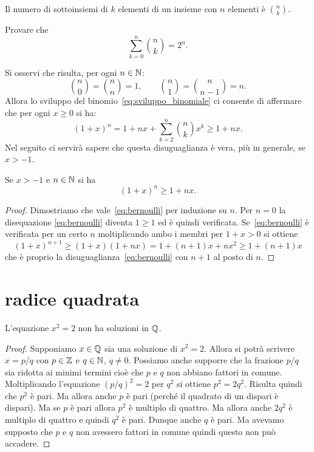 \begin{exercise}
Il numero di sottoinsiemi di $k$ elementi di un insieme con $n$ elementi
è ${n\choose k}$.
\end{exercise}

\begin{exercise}
Provare che
\[
 \sum_{k=0}^n {n \choose k} = 2^n.
\]
\end{exercise}

Si osservi che risulta, per ogni $n\in \mathbb N$:
\[
  {n\choose 0} = {n \choose n} = 1,
  \qquad
  {n \choose 1} = {n \choose n-1} = n.
\]
Allora lo sviluppo del binomio~\eqref{eq:sviluppo_binomiale}
ci consente di affermare
che per ogni $x\ge 0$ si ha:
\[
  (1+x)^n = 1 + nx + \sum_{k=2}^n {n\choose k} x^k
  \ge 1 + nx.
\]
Nel seguito ci servirà sapere che questa
disuguaglianza è vera, più in generale,
se $x > -1$.

\begin{theorem}
\label{th:disuguaglianza_bernoulli}%
\mymark{**}%
%
%
%
Se $x > -1$ e $n\in \mathbb N$ si ha
\begin{equation}
\label{eq:bernoulli}
(1+x)^n \ge 1 + nx.
\end{equation}
\end{theorem}
%
\begin{proof}
\mymark{**}
Dimostriamo che vale~\eqref{eq:bernoulli}
per induzione su $n$.
Per $n=0$ la disequazione \eqref{eq:bernoulli} diventa $1\ge 1$
ed è quindi verificata.
Se~\eqref{eq:bernoulli}
è verificata per un certo $n$
moltiplicando ambo i membri per $1+x > 0$ si ottiene
\[
(1+x)^{n+1} \ge (1+x) (1+nx) = 1 + (n+1)x + n x^2
\ge 1 + (n+1)x
\]
che è proprio la disuguaglianza~\eqref{eq:bernoulli}
con $n+1$ al posto di $n$.
\end{proof}

\section{radice quadrata}
\label{sec:radice_quadrata}

\begin{theorem}
\mymark{**}%
\label{th:pitagora}
L'equazione $x^2=2$ non ha soluzioni in $\mathbb Q$.
\end{theorem}
%
\begin{proof}
\mymark{*}%
Supponiamo $x\in \mathbb Q$ sia una soluzione di $x^2=2$.
Allora si potrà scrivere $x=p/q$ con $p\in \mathbb Z$ e $q\in \mathbb N$, $q\neq 0$.
Possiamo anche supporre che la frazione $p/q$ sia ridotta ai minimi
termini cioè che $p$ e $q$ non abbiano fattori in comune.
Moltiplicando l'equazione
$(p/q)^2=2$ per $q^2$ si ottiene $p^2 = 2 q^2$.
Risulta quindi che $p^2$ è pari.
Ma allora anche $p$ è pari (perché il quadrato di un dispari è dispari).
Ma se $p$ è pari allora $p^2$ è multiplo di quattro.
Ma allora anche $2q^2$ è multiplo di quattro e quindi $q^2$ è pari.
Dunque anche $q$ è pari. Ma avevamo supposto che $p$ e $q$ non avessero
fattori in comune quindi questo non può accadere.
\end{proof}


